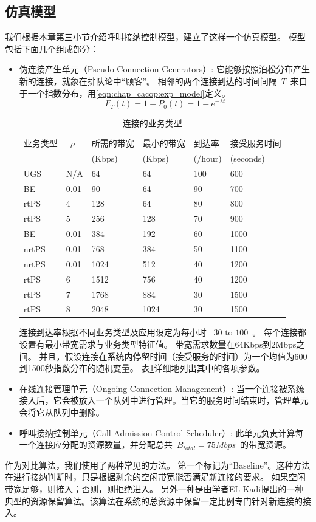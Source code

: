 \subsection{仿真模型}
我们根据本章第三小节介绍呼叫接纳控制模型，建立了这样一个仿真模型。
模型包括下面几个组成部分：
\begin{itemize}
\item 伪连接产生单元（Pseudo Connection Generators）: 它能够按照泊松分布产生新的连接，就象在排队论中“顾客”。
    相邻的两个连接到达的时间间隔~$T$~来自于一个指数分布，用\eqref{eqn:chap_cacop:exp_model}定义。
%
\begin{equation}
\label{eqn:chap_cacop:exp_model}
F_T(t) = 1 - P_0(t) = 1 - e^{-\lambda t}
\end{equation}
%
\begin{table}[tb]
\caption{连接的业务类型} \label{tb:chap_cacop:sim_cfg}
\begin{center}
\wuhao
\begin{tabularx}{0.99\linewidth}{XXXXXp{2.5cm}}
\toprule
业务类型 &~$\rho$~ &所需的带宽 & 最小的带宽 &到达率 &接受服务时间 \\
&&(Kbps)& (Kbps) & (/hour) &(seconds) \\
\midrule
UGS& N/A &64 &64 & 100 &600\\
BE & 0.01&90 &64 &90 &700\\
rtPS &4& 128 &64 &80 &800\\
rtPS &5& 256 &128 &70 &900\\
BE &0.01& 384 &192 &60 &1000\\
nrtPS &0.01& 768 &384 &50 &1100\\
nrtPS &0.01& 1024 &512 &40 &1200\\
rtPS &6& 1512 &756 &40 &1200\\
rtPS &7& 1768 &884 &30 &1500\\
rtPS &8& 2048 &1024 &30 &1500\\
\bottomrule
\end{tabularx}
\end{center}
\end{table}
连接到达率根据不同业务类型及应用设定为每小时 ~$30 \text{ to } 100 $~。
每个连接都设置有最小带宽需求与业务类型特征值。
带宽需求数量在64Kbps到2Mbps之间。
并且，假设连接在系统内停留时间（接受服务的时间）为一个均值为600到1500秒指数分布的随机变量。
表\ref{tb:chap_cacop:sim_cfg}详细地列出其中的各项参数。

\item 在线连接管理单元（Ongoing Connection Management）: 当一个连接被系统接入后，它会被放入一个队列中进行管理。当它的服务时间结束时，管理单元会将它从队列中删除。

\item 呼叫接纳控制单元（Call Admission Control Scheduler）: 此单元负责计算每一个连接应分配的资源数量，并分配总共~$B_{total}=75Mbps$~的带宽资源。 
\end{itemize}
作为对比算法，我们使用了两种常见的方法。
第一个标记为“Baseline”。这种方法在进行接纳判断时，只是根据剩余的空闲带宽能否满足新连接的要求。
如果空闲带宽足够，则接入；否则，则拒绝进入。
另外一种是由学者EL Kadi提出的一种典型的资源保留算法。该算法在系统的总资源中保留一定比例专门针对新连接的接入\cite{EL-Kadi2002}。
